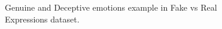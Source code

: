 \begin{figure}[H]
     \begin{center}
%
%
    \end{center}
    \caption{%
        Genuine and Deceptive emotions example in Fake vs Real Expressions dataset.
     }%
   \label{fig:fakedataset_fake-real_subfigures}
\end{figure}